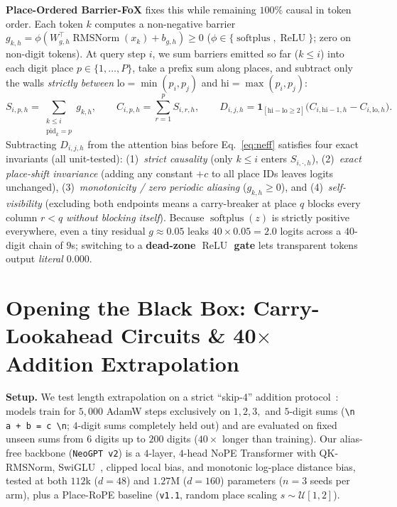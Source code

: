 \documentclass[10pt]{article}
\begin{document}
\textbf{Place-Ordered Barrier-FoX} fixes this while remaining $100\%$ causal in token order. Each token $k$ computes a non-negative barrier $g_{k,h} = \phi(W_{g,h}^\top \operatorname{RMSNorm}(x_k) + b_{g,h}) \ge 0$ ($\phi \in \{\operatorname{softplus}, \operatorname{ReLU}\}$; zero on non-digit tokens). At query step $i$, we sum barriers emitted so far ($k \le i$) into each digit place $p \in \{1,\dots,P\}$, take a prefix sum along places, and subtract only the walls \emph{strictly between} $\mathrm{lo}=\min(p_i,p_j)$ and $\mathrm{hi}=\max(p_i,p_j)$:
\begin{equation}
  S_{i,p,h} = \sum_{\substack{k \le i \\ \mathrm{pid}_k = p}} g_{k,h}, \qquad
  C_{i,p,h} = \sum_{r=1}^{p} S_{i,r,h}, \qquad
  D_{i,j,h} = \mathbf{1}_{[\mathrm{hi}-\mathrm{lo} \ge 2]}\big(C_{i,\mathrm{hi}-1,h} - C_{i,\mathrm{lo},h}\big).
  \label{eq:bfox}
\end{equation}
Subtracting $D_{i,j,h}$ from the attention bias before Eq.~\eqref{eq:neff} satisfies four exact invariants (all unit-tested):
(1)~\emph{strict causality} (only $k \le i$ enters $S_{i,\cdot,h}$),
(2)~\emph{exact place-shift invariance} (adding any constant $+c$ to all place IDs leaves logits unchanged),
(3)~\emph{monotonicity / zero periodic aliasing} ($g_{k,h} \ge 0$), and
(4)~\emph{self-visibility} (excluding both endpoints means a carry-breaker at place $q$ blocks every column $r < q$ \emph{without blocking itself}).
Because $\operatorname{softplus}(z)$ is strictly positive everywhere, even a tiny residual $g \approx 0.05$ leaks $40 \times 0.05 = 2.0$ logits across a $40$-digit chain of $9$s; switching to a \textbf{dead-zone $\operatorname{ReLU}$ gate} lets transparent tokens output \emph{literal $0.000$}.

\section{Opening the Black Box: Carry-Lookahead Circuits \& \texorpdfstring{40$\times$}{40x} Addition Extrapolation}
\label{sec:add}

\textbf{Setup.} We test length extrapolation on a strict ``skip-4'' addition protocol~\cite{mcleish2024}: models train for $5{,}000$ AdamW steps exclusively on $1, 2, 3,$ and $5$-digit sums (\texttt{\textbackslash n a + b = c \textbackslash n}; $4$-digit sums completely held out) and are evaluated on fixed unseen sums from $6$ digits up to $200$ digits ($40\times$ longer than training). Our alias-free backbone (\texttt{NeoGPT v2}) is a $4$-layer, $4$-head NoPE Transformer with QK-RMSNorm, SwiGLU~\cite{shazeer2020}, clipped local bias, and monotonic log-place distance bias, tested at both $112\text{k}$ ($d=48$) and $1.27\text{M}$ ($d=160$) parameters ($n=3$ seeds per arm), plus a Place-RoPE baseline (\texttt{v1.1}, random place scaling $s \sim \mathcal{U}[1,2]$).
\end{document}
